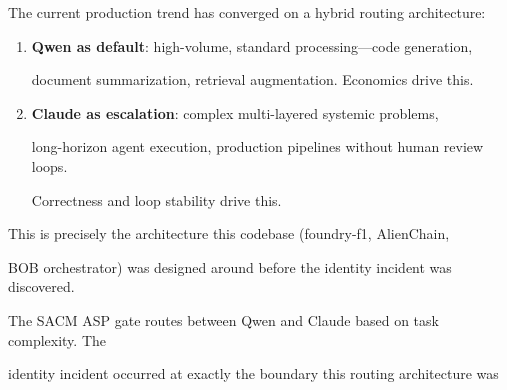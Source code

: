 The current production trend has converged on a hybrid routing architecture:











\begin{enumerate}





  \item \textbf{Qwen as default}: high-volume, standard processing---code generation,





    document summarization, retrieval augmentation. Economics drive this.





  \item \textbf{Claude as escalation}: complex multi-layered systemic problems,





    long-horizon agent execution, production pipelines without human review loops.





    Correctness and loop stability drive this.





\end{enumerate}











This is precisely the architecture this codebase (foundry-f1, AlienChain,





BOB orchestrator) was designed around before the identity incident was discovered.





The SACM ASP gate routes between Qwen and Claude based on task complexity. The





identity incident occurred at exactly the boundary this routing architecture was





